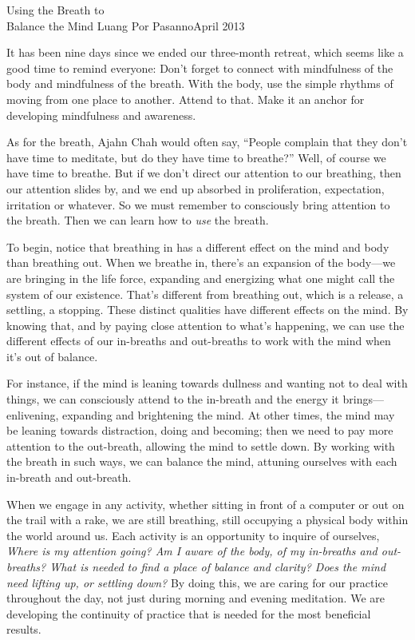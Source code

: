 {Using the Breath to\\Balance the Mind}
{Luang Por Pasanno}{April 2013}

It has been nine days since we ended our three-month retreat, which 
seems like a good time to remind everyone: Don't forget to connect with 
mindfulness of the body and mindfulness of the breath. With the body, 
use the simple rhythms of moving from one place to another. Attend to 
that. Make it an anchor for developing mindfulness and awareness.

As for the breath, Ajahn Chah would often say, ``People complain that 
they don't have time to meditate, but do they have time to breathe?'' 
Well, of course we have time to breathe. But if we don't direct our 
attention to our breathing, then our attention slides by, and we end up 
absorbed in proliferation, expectation, irritation or whatever. So we 
must remember to consciously bring attention to the breath. Then we can 
learn how to \emph{use} the breath.

To begin, notice that breathing in has a different effect on the mind 
and body than breathing out. When we breathe in, there's an expansion 
of the body---we are bringing in the life force, expanding and 
energizing what one might call the system of our existence. That's 
different from breathing out, which is a release, a settling, a 
stopping. These distinct qualities have different effects on the mind. 
By knowing that, and by paying close attention to what's happening, we 
can use the different effects of our in-breaths and out-breaths to work 
with the mind when it's out of balance.

For instance, if the mind is leaning towards dullness and wanting not 
to deal with things, we can consciously attend to the in-breath and the 
energy it brings---enlivening, expanding and brightening the mind. At 
other times, the mind may be leaning towards distraction, doing and 
becoming; then we need to pay more attention to the out-breath, 
allowing the mind to settle down. By working with the breath in such 
ways, we can balance the mind, attuning ourselves with each in-breath 
and out-breath.

When we engage in any activity, whether sitting in front of a computer 
or out on the trail with a rake, we are still breathing, still 
occupying a physical body within the world around us. Each activity is 
an opportunity to inquire of ourselves, \emph{Where is my attention 
going? Am I aware of the body, of my in-breaths and out-breaths? What 
is needed to find a place of balance and clarity? Does the mind need 
lifting up, or settling down?} By doing this, we are caring for our 
practice throughout the day, not just during morning and evening 
meditation. We are developing the continuity of practice that is needed 
for the most beneficial results.

